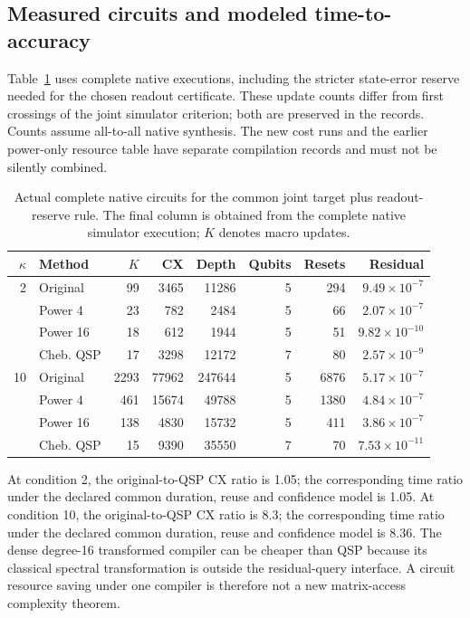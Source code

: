 \documentclass{ieeeaccess}
\begin{document}
\subsection{Measured circuits and modeled time-to-accuracy}
Table~\ref{tab:chebcost} uses complete native executions, including the stricter state-error reserve needed for the chosen readout certificate. These update counts differ from first crossings of the joint simulator criterion; both are preserved in the records. Counts assume all-to-all native synthesis. The new cost runs and the earlier power-only resource table have separate compilation records and must not be silently combined.
\begin{table}[!tbp]\small\centering\caption{Actual complete native circuits for the common joint target plus readout-reserve rule. The final column is obtained from the complete native simulator execution; $K$ denotes macro updates.}\label{tab:chebcost}

\begin{tabular*}{\textwidth}{@{\extracolsep{\fill}}rlrrrrrr@{}}\toprule
$\kappa$ & Method & $K$ & CX & Depth & Qubits & Resets & Residual \\
\midrule
2  & Original   & 99   & 3465  & 11286  & 5 & 294  & $9.49\times10^{-7}$ \\
& Power 4    & 23   & 782   & 2484   & 5 & 66   & $2.07\times10^{-7}$ \\
& Power 16   & 18   & 612   & 1944   & 5 & 51   & $9.82\times10^{-10}$ \\
& Cheb. QSP  & 17   & 3298  & 12172  & 7 & 80   & $2.57\times10^{-9}$ \\
\midrule
10 & Original   & 2293 & 77962 & 247644 & 5 & 6876 & $5.17\times10^{-7}$ \\
& Power 4    & 461  & 15674 & 49788  & 5 & 1380 & $4.84\times10^{-7}$ \\
& Power 16   & 138  & 4830  & 15732  & 5 & 411  & $3.86\times10^{-7}$ \\
& Cheb. QSP  & 15   & 9390  & 35550  & 7 & 70   & $7.53\times10^{-11}$ \\
\bottomrule\end{tabular*}

\end{table}
At condition 2, the original-to-QSP CX ratio is 1.05; the corresponding time ratio under the declared common duration, reuse and confidence model is 1.05. At condition 10, the original-to-QSP CX ratio is 8.3; the corresponding time ratio under the declared common duration, reuse and confidence model is 8.36. The dense degree-16 transformed compiler can be cheaper than QSP because its classical spectral transformation is outside the residual-query interface. A circuit resource saving under one compiler is therefore not a new matrix-access complexity theorem.
\end{document}
